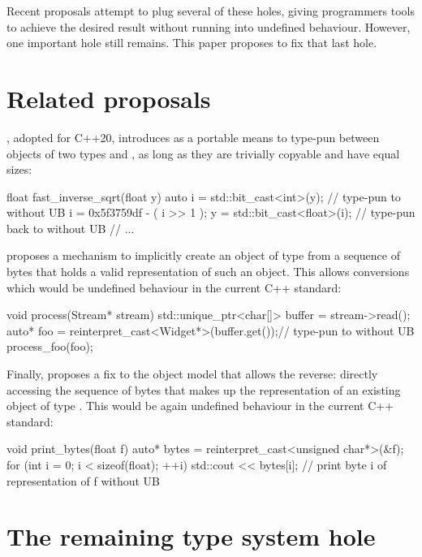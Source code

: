 Recent proposals attempt to plug several of these holes, giving programmers tools to achieve the desired result without running into undefined behaviour. However, one important hole still remains. This paper proposes to fix that last hole.

\section{Related proposals}

\cite{P0476R2}, adopted for C++20, introduces  as a portable means to type-pun between objects of two types  and , as long as they are trivially copyable and have equal sizes:

\begin{codeblock}
float fast_inverse_sqrt(float y) 
{
    auto i = std::bit_cast<int>(y);   // type-pun  to  without UB
    i  = 0x5f3759df - ( i >> 1 );
    y = std::bit_cast<float>(i);   // type-pun  back to  without UB
    // ...
}
\end{codeblock}

\cite{P0593R4} proposes a mechanism to implicitly create an object of type  from a sequence of bytes that holds a valid representation of such an object. This allows conversions which would be undefined behaviour in the current C++ standard:

\begin{codeblock}
void process(Stream* stream) 
{
    std::unique_ptr<char[]> buffer = stream->read();
    auto* foo = reinterpret_cast<Widget*>(buffer.get());// type-pun  to  without UB
    process_foo(foo);
}
\end{codeblock}

Finally, \cite{P1839R0} proposes a fix to the object model that allows the reverse: directly accessing the sequence of bytes that makes up the representation of an existing object of type . This would be again undefined behaviour in the current C++ standard:

\begin{codeblock}
void print_bytes(float f)
{
    auto* bytes = reinterpret_cast<unsigned char*>(&f);
    for (int i = 0; i < sizeof(float); ++i)
        std::cout << bytes[i];    // print byte i of representation of f without UB
}

\end{codeblock}

\section{The remaining type system hole}

